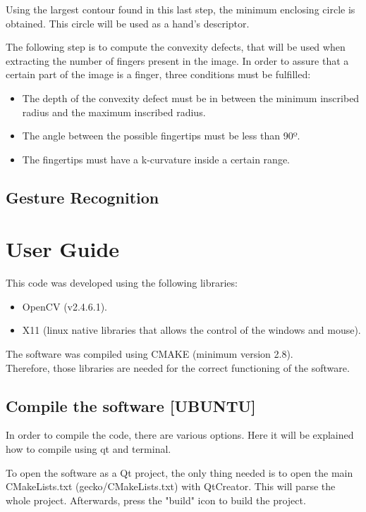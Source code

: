 \documentclass{article}
\begin{document}
Using the largest contour found in this last step, the minimum enclosing circle is obtained. This circle will be used as a hand's descriptor.

The following step is to compute the convexity defects, that will be used when extracting the number of fingers present in the image. 
In order to assure that a certain part of the image is a finger, three conditions must be fulfilled: 
\begin{itemize}
\item The depth of the convexity defect must be in between the minimum inscribed radius and the maximum inscribed radius. 
\item The angle between the possible fingertips must be less than 90º. 
\item The fingertips must have a k-curvature inside a certain range.
\end{itemize}


\subsection{Gesture Recognition} 


\section{User Guide}
This code was developed using the following libraries: 
\begin{itemize}
\item OpenCV (v2.4.6.1).
\item X11 (linux native libraries that allows the control of the windows and mouse). 
\end{itemize}
The software was compiled using CMAKE (minimum version 2.8).
\\[0.5cm]
Therefore, those libraries are needed for the correct functioning of the software. 


\subsection{Compile the software [UBUNTU]}

In order to compile the code, there are various options. Here it will be explained how to compile using qt and terminal. 

To open the software as a Qt project, the only thing needed is to open the main CMakeLists.txt (gecko/CMakeLists.txt) with QtCreator. This will parse the whole project. 
Afterwards, press the "build" icon to build the project. 
\end{document}

